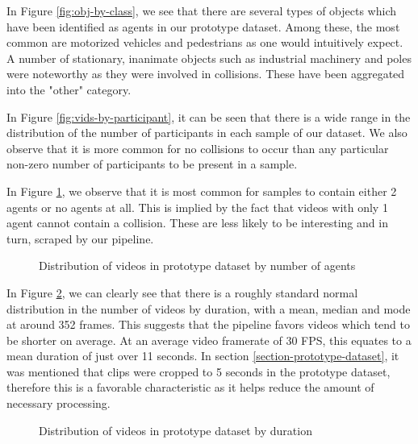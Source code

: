 \documentclass[letterpaper, 10 pt, conference]{ieeeconf}
\begin{document}
In Figure \ref{fig:obj-by-class}, we see that there are several types of objects which have been identified as agents in our prototype dataset. Among these, the most common are motorized vehicles and pedestrians as one would intuitively expect. A number of stationary, inanimate objects such as industrial machinery and poles were noteworthy as they were involved in collisions. These have been aggregated into the "other" category.

In Figure \ref{fig:vids-by-participant}, it can be seen that there is a wide range in the distribution of the number of participants in each sample of our dataset. We also observe that it is more common for no collisions to occur than any particular non-zero number of participants to be present in a sample.

In Figure \ref{fig:vids-by-agents}, we observe that it is most common for samples to contain either 2 agents or no agents at all. This is implied by the fact that videos with only 1 agent cannot contain a collision. These are less likely to be interesting and in turn, scraped by our pipeline.

\begin{figure}[!h]
	\centering
	\caption{Distribution of videos in prototype dataset by number of agents}
	\label{fig:vids-by-agents}
\end{figure}

In Figure \ref{fig:vids-by-duration}, we can clearly see that there is a roughly standard normal distribution in the number of videos by duration, with a mean, median and mode at around 352 frames. This suggests that the pipeline favors videos which tend to be shorter on average. At an average video framerate of 30 FPS, this equates to a mean duration of just over 11 seconds. In section \ref{section-prototype-dataset}, it was mentioned that clips were cropped to 5 seconds in the prototype dataset, therefore this is a favorable characteristic as it helps reduce the amount of necessary processing.

\begin{figure}[!h]
	\centering
	\caption{Distribution of videos in prototype dataset by duration}
	\label{fig:vids-by-duration}
\end{figure}
\end{document}
